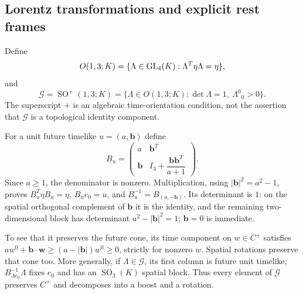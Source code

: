 \documentclass[11pt,letterpaper]{article}
\theoremstyle{definition}
\theoremstyle{remark}
\newcommand{\SO}{\operatorname{SO}}\newcommand{\SL}{\operatorname{SL}}
\begin{document}
\subsection{Lorentz transformations and explicit rest frames}
Define
\begin{equation}
 O(1,3;K)=\{\Lambda\in\operatorname{GL}_4(K):\Lambda^T\eta\Lambda=\eta\},
\end{equation}
and
\begin{equation}\label{vtf:mink:eq:G}
 \mathcal G=\SO^+(1,3;K)=
 \{\Lambda\in O(1,3;K):\det\Lambda=1,\ \Lambda^0{}_0>0\}.
\end{equation}
The superscript $+$ is an algebraic time-orientation condition, not the assertion that $\mathcal G$ is a topological identity component.

For a unit future timelike $u=(a,\mathbf b)$ define
\begin{equation}\label{vtf:mink:eq:restboost}
 B_u=\begin{pmatrix}
 a&\mathbf b^T\\
 \mathbf b&I_3+\dfrac{\mathbf b\mathbf b^T}{a+1}
 \end{pmatrix}.
\end{equation}
Since $a\ge1$, the denominator is nonzero. Multiplication, using $|\mathbf b|^2=a^2-1$, proves $B_u^T\eta B_u=\eta$, $B_ue_0=u$, and
$B_u^{-1}=B_{(a,-\mathbf b)}$. Its determinant is $1$: on the spatial orthogonal complement of $\mathbf b$ it is the identity, and the remaining two-dimensional block has determinant $a^2-|\mathbf b|^2=1$; $\mathbf b=0$ is immediate.

To see that it preserves the future cone, its time component on $w\in C^+$ satisfies
$a w^0+\mathbf b\cdot\mathbf w\ge(a-|\mathbf b|)w^0\ge0$, strictly for nonzero $w$. Spatial rotations preserve that cone too. More generally, if $\Lambda\in\mathcal G$, its first column is future unit timelike; $B_{\Lambda e_0}^{-1}\Lambda$ fixes $e_0$ and has an $\SO_3(K)$ spatial block. Thus every element of $\mathcal G$ preserves $C^+$ and decomposes into a boost and a rotation.
\end{document}

